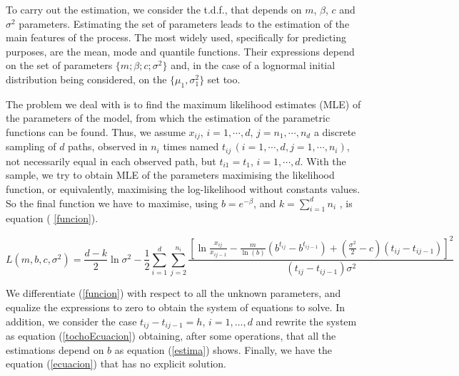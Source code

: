 \documentclass{sig-alternate}
\begin{document}
To carry out the estimation, we consider the t.d.f., that depends on $m$, $\beta$, $c$ and $\sigma^2$ parameters. Estimating the set of parameters leads to the estimation of the main features of the process. The most widely used, specifically for predicting purposes, are the mean, mode and quantile functions. Their expressions depend on the set of parameters $\{m;\beta; c; \sigma^2\}$ and, in the case of a lognormal initial distribution being considered, on the $\{ \mu_1, \sigma_1^2 \}$ set too.

The problem we deal with is to find the maximum likelihood estimates
(MLE) of the parameters of the model, from which the estimation of the
parametric functions can be found. Thus, we assume $x_{ij}$,
$i=1,\cdots,d$, $j=n_1, \cdots, n_d$ a discrete sampling of $d$ paths,
observed in $n_i$ times named $t_{ij}\,(i=1,\cdots,d,j=1,\cdots,n_i
)$, not necessarily equal in each observed path, but $t_{i1}=t_{1}$,
$i=1,\cdots, d$. With the sample, we try to obtain MLE of the
parameters maximising the likelihood function, or equivalently,
maximising the log-likelihood without constants values. So the final
function we have to maximise, using $b=e^{-\beta}$, and
$k=\sum_{i=1}^d n_i$ , is equation ( \ref{funcion}). 

\begin{figure*}[htb]
\begin{equation}
\label{funcion}
L(m,b,c,\sigma^2)=\frac{d-k}{2}\ln\sigma^2
-\frac{1}{2}\sum_{i=1}^d\sum_{j=2}^{n_i}\frac{\left[\ln\frac{x_{ij}}{x_{ij-1}}-
    \frac{m}{\ln(b)} \left(b^{t_{ij}}-b^{t_{ij-1}}\right)+\left(\frac{\sigma^2}{2}-c\right)(t_{ij}-t_{ij-1})\right]^2}
    {(t_{ij}-t_{ij-1})\sigma^2}
\end{equation}
\end{figure*}

We differentiate (\ref{funcion}) with respect to all the unknown parameters, and equalize the expressions to zero to obtain the system of equations to solve. In addition, we consider the case $t_{ij}-t_{ij-1}=h$, $i=1,\ldots,d$ and rewrite the system as equation (\ref{tochoEcuacion}) obtaining, after some operations, that all the estimations depend on $b$ as equation (\ref{estima}) shows. Finally, we have the equation (\ref{ecuacion}) that has no explicit solution.
\end{document}

